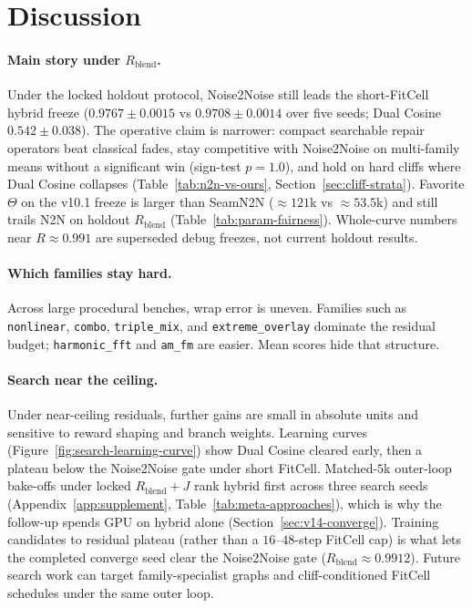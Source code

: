 \section{Discussion}
\label{sec:discussion}

\paragraph{Main story under $R_{\mathrm{blend}}$.}
Under the locked holdout protocol, Noise2Noise still leads the short-FitCell hybrid freeze
($0.9767{\pm}0.0015$ vs $0.9708{\pm}0.0014$ over five seeds; Dual Cosine $0.542{\pm}0.038$).
The operative claim is narrower: compact searchable repair operators beat classical fades, stay competitive with Noise2Noise on multi-family means without a significant win (sign-test $p{=}1.0$), and hold on hard cliffs where Dual Cosine collapses
(Table~\ref{tab:n2n-vs-ours}, Section~\ref{sec:cliff-strata}).
Favorite $\Theta$ on the v10.1 freeze is larger than SeamN2N (${\approx}121$k vs ${\approx}53.5$k) and still trails N2N on holdout $R_{\mathrm{blend}}$
(Table~\ref{tab:param-fairness}).
Whole-curve numbers near $R{\approx}0.991$ are superseded debug freezes, not current holdout results.

\paragraph{Which families stay hard.}
Across large procedural benches, wrap error is uneven.
Families such as \texttt{nonlinear}, \texttt{combo}, \texttt{triple\_mix}, and \texttt{extreme\_overlay} dominate the residual budget;
\texttt{harmonic\_fft} and \texttt{am\_fm} are easier.
Mean scores hide that structure.

\paragraph{Search near the ceiling.}
Under near-ceiling residuals, further gains are small in absolute units and sensitive to reward shaping and branch weights.
Learning curves (Figure~\ref{fig:search-learning-curve}) show Dual Cosine cleared early, then a plateau below the Noise2Noise gate under short FitCell.
Matched-$5$k outer-loop bake-offs under locked $R_{\mathrm{blend}}{+}J$ rank hybrid first across three search seeds
(Appendix~\ref{app:supplement}, Table~\ref{tab:meta-approaches}), which is why the follow-up spends GPU on hybrid alone
(Section~\ref{sec:v14-converge}).
Training candidates to residual plateau (rather than a $16$--$48$-step FitCell cap) is what lets the completed converge seed clear the Noise2Noise gate ($R_{\mathrm{blend}}{\approx}0.9912$).
Future search work can target family-specialist graphs and cliff-conditioned FitCell schedules under the same outer loop.

